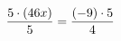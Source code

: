 \documentclass[preview]{standalone}
\begin{document}
\begin{align*}
\special{dvisvgm:raw <g id='unique000'>}\frac{5 \cdot (46 x)}{5} = \frac{(-9) \cdot 5}{4}\special{dvisvgm:raw </g>}
\end{align*}
\end{document}
